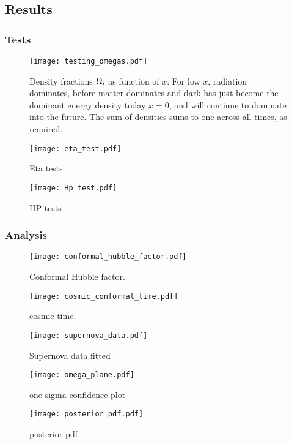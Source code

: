 \subsection{Results}\label{sec:m1:results}

\subsubsection{Tests}\label{sec:m1:results:tests}

\begin{figure}
    \texttt{[image: testing\_omegas.pdf]}
    \caption{Density fractions $\Omega_i$ as function of $x$. For low $x$, radiation dominates, before matter dominates and dark has just become the dominant energy density today $x=0$, and will continue to dominate into the future. The sum of densities sums to one across all times, as required.}
    \label{fig:m1:omega_tests}
\end{figure}

\begin{figure}
    \texttt{[image: eta\_test.pdf]}
    \caption{Eta tests}
    \label{fig:m1:eta_tests}
\end{figure}

\begin{figure}
    \texttt{[image: Hp\_test.pdf]}
    \caption{HP tests}
    \label{fig:m1:Hp_tests}
\end{figure}

\subsubsection{Analysis}



\begin{figure}
    \texttt{[image: conformal\_hubble\_factor.pdf]}
    \caption{Conformal Hubble factor.}
    \label{fig:m1:conformal_hubble_factor_Hp}
\end{figure}

\begin{figure}
    \texttt{[image: cosmic\_conformal\_time.pdf]}
    \caption{cosmic time.}
    \label{fig:m1:cosmic_conformal_time}
\end{figure}

\begin{figure}
    \texttt{[image: supernova\_data.pdf]}
    \caption{Supernova data fitted}
    \label{fig:m1:supernova_data}
\end{figure}

\begin{figure}
    \texttt{[image: omega\_plane.pdf]}
    \caption{one sigma confidence plot}
    \label{fig:m1:omega_planes}
\end{figure}

\begin{figure}
    \texttt{[image: posterior\_pdf.pdf]}
    \caption{posterior pdf.}
    \label{fig:m1:posterior_pdf}
\end{figure}

